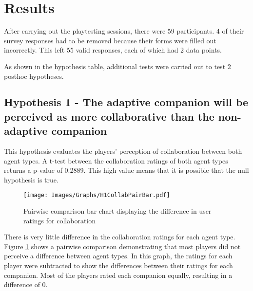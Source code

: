 \documentclass{IEEEtran}
\begin{document}
\section{Results}
\label{Results}



After carrying out the playtesting sessions, there were 59 participants. 4 of their survey responses had to be removed because their forms were filled out incorrectly. This left 55 valid responses, each of which had 2 data points.

As shown in the hypothesis table, additional tests were carried out to test 2 posthoc hypotheses.




\subsection{Hypothesis 1 - The adaptive companion will be perceived as more collaborative than the non-adaptive companion}

This hypothesis evaluates the players’ perception of collaboration between both agent types. A t-test between the collaboration ratings of both agent types returns a p-value of 0.2889. This high value means that it is possible that the null hypothesis is true.

\begin{figure}[!h]
  \centering
  \texttt{[image: Images/Graphs/H1CollabPairBar.pdf]}
  
\caption{Pairwise comparison bar chart displaying the difference in user ratings for collaboration}
\label{fig:H1CollabPairBar}
\end{figure}

There is very little difference in the collaboration ratings for each agent type. Figure \ref{fig:H1CollabPairBar} shows a pairwise comparison demonstrating that most players did not perceive a difference between agent types. In this graph, the ratings for each player were subtracted to show the differences between their ratings for each companion.
Most of the players rated each companion equally, resulting in a difference of 0.
\end{document}
